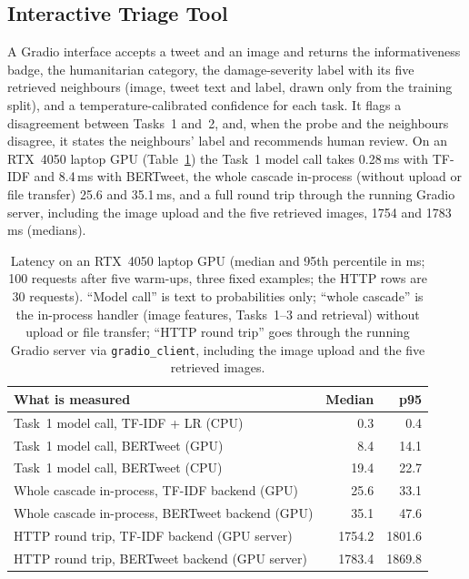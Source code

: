 \documentclass[conference]{IEEEtran}
\begin{document}
\subsection{Interactive Triage Tool}
A Gradio interface accepts a tweet and an image and returns the informativeness badge, the humanitarian category, the damage-severity label with its five retrieved neighbours (image, tweet text and label, drawn only from the training split), and a temperature-calibrated confidence for each task. It flags a disagreement between Tasks~1 and~2, and, when the probe and the neighbours disagree, it states the neighbours' label and recommends human review. On an RTX~4050 laptop GPU (Table~\ref{tab:latency}) the Task~1 model call takes 0.28\,ms with TF-IDF and 8.4\,ms with BERTweet, the whole cascade in-process (without upload or file transfer) 25.6 and 35.1\,ms, and a full round trip through the running Gradio server, including the image upload and the five retrieved images, 1754 and 1783\,ms (medians).

\begin{table}[t]
\centering
\caption{Latency on an RTX~4050 laptop GPU (median and 95th percentile in ms; 100 requests after five warm-ups, three fixed examples; the HTTP rows are 30 requests). ``Model call'' is text to probabilities only; ``whole cascade'' is the in-process handler (image features, Tasks~1--3 and retrieval) without upload or file transfer; ``HTTP round trip'' goes through the running Gradio server via \texttt{gradio\_client}, including the image upload and the five retrieved images.}
\label{tab:latency}
\footnotesize
\setlength{\tabcolsep}{3pt}
\begin{tabular}{lrr}
\toprule
What is measured & Median & p95 \\
\midrule
Task~1 model call, TF-IDF + LR (CPU) & 0.3 & 0.4 \\
Task~1 model call, BERTweet (GPU) & 8.4 & 14.1 \\
Task~1 model call, BERTweet (CPU) & 19.4 & 22.7 \\
Whole cascade in-process, TF-IDF backend (GPU) & 25.6 & 33.1 \\
Whole cascade in-process, BERTweet backend (GPU) & 35.1 & 47.6 \\
HTTP round trip, TF-IDF backend (GPU server) & 1754.2 & 1801.6 \\
HTTP round trip, BERTweet backend (GPU server) & 1783.4 & 1869.8 \\
\bottomrule
\end{tabular}
\end{table}
\end{document}
